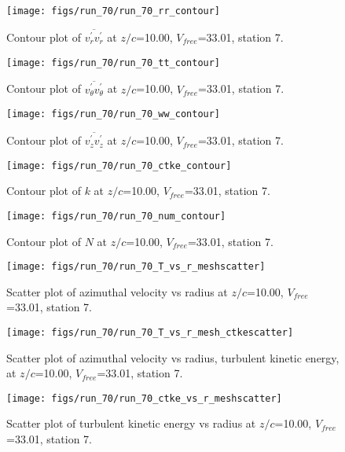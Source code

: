 \begin{figure}[H]
\centering
\texttt{[image: figs/run\_70/run\_70\_rr\_contour]}
\caption{Contour plot of $\overline{v_{r}^{\prime} v_{r}^{\prime}}$ at $z/c$=10.00, $V_{free}$=33.01, station 7.}
\end{figure}


\begin{figure}[H]
\centering
\texttt{[image: figs/run\_70/run\_70\_tt\_contour]}
\caption{Contour plot of $\overline{v_{\theta}^{\prime} v_{\theta}^{\prime}}$ at $z/c$=10.00, $V_{free}$=33.01, station 7.}
\end{figure}


\begin{figure}[H]
\centering
\texttt{[image: figs/run\_70/run\_70\_ww\_contour]}
\caption{Contour plot of $\overline{v_{z}^{\prime} v_{z}^{\prime}}$ at $z/c$=10.00, $V_{free}$=33.01, station 7.}
\end{figure}


\begin{figure}[H]
\centering
\texttt{[image: figs/run\_70/run\_70\_ctke\_contour]}
\caption{Contour plot of $k$ at $z/c$=10.00, $V_{free}$=33.01, station 7.}
\end{figure}


\begin{figure}[H]
\centering
\texttt{[image: figs/run\_70/run\_70\_num\_contour]}
\caption{Contour plot of $N$ at $z/c$=10.00, $V_{free}$=33.01, station 7.}
\end{figure}


\begin{figure}[H]
\centering
\texttt{[image: figs/run\_70/run\_70\_T\_vs\_r\_meshscatter]}
\caption{Scatter plot of azimuthal velocity vs radius at $z/c$=10.00, $V_{free}$=33.01, station 7.}
\end{figure}


\begin{figure}[H]
\centering
\texttt{[image: figs/run\_70/run\_70\_T\_vs\_r\_mesh\_ctkescatter]}
\caption{Scatter plot of azimuthal velocity vs radius, turbulent kinetic energy, at $z/c$=10.00, $V_{free}$=33.01, station 7.}
\end{figure}


\begin{figure}[H]
\centering
\texttt{[image: figs/run\_70/run\_70\_ctke\_vs\_r\_meshscatter]}
\caption{Scatter plot of turbulent kinetic energy vs radius at $z/c$=10.00, $V_{free}$=33.01, station 7.}
\end{figure}


